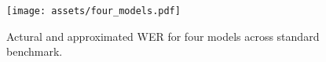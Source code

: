     



\begin{figure}
    \centering
    \texttt{[image: assets/four\_models.pdf]}
    \caption{Actural and approximated WER for four models across standard benchmark.}
    \label{fig:enter-label}
\end{figure}